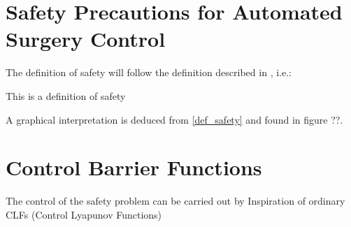 \section{Safety Precautions for Automated Surgery Control}
The definition of safety will follow the definition described in \citep{bib:safety}, i.e.:
\begin{exa}
This is a definition of safety
\label{def_safety}
\end{exa}
A graphical interpretation is deduced from \autoref{def_safety} and found in figure ??.
\section{Control Barrier Functions}
The control of the safety problem can be carried out by Inspiration of ordinary CLFs (Control Lyapunov Functions) \citep{bib:org_control}